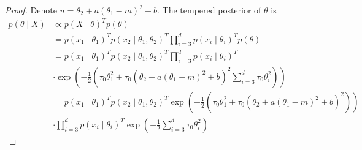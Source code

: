\documentclass[english,twoside,openright]{HYgraduMLDS}
\begin{document}
\begin{appendices}
\begin{proof}
    Denote \(u = \theta_2 + a(\theta_1 - m)^2 + b\).
    The tempered posterior of \(\theta\) is
    \begin{align*}
        p(\theta\mid X) &\propto p(X\mid \theta)^Tp(\theta)
        \\&= p(x_1\mid \theta_1)^Tp(x_2\mid \theta_1, \theta_2)^T
        \prod_{i=3}^d p(x_i\mid \theta_i)^T p(\theta)
        \\&= p(x_1\mid \theta_1)^Tp(x_2\mid \theta_1, \theta_2)^T
        \prod_{i=3}^d p(x_i\mid \theta_i)^T
        \\&\cdot \exp\left(-\frac{1}{2}\left(\tau_0\theta_1^2
        + \tau_0(\theta_2 + a(\theta_1 - m)^2 + b)^2
        \sum_{i=3}^d \tau_0\theta_i^2\right)\right)
        \\&= p(x_1\mid \theta_1)^Tp(x_2\mid \theta_1, \theta_2)^T
        \exp\left(-\frac{1}{2}\left(\tau_0\theta_1^2
        + \tau_0(\theta_2 + a(\theta_1 - m)^2 + b)^2\right)\right)
        \\&\cdot \prod_{i=3}^d p(x_i\mid \theta_i)^T
        \exp\left(-\frac{1}{2}\sum_{i=3}^d \tau_0\theta_i^2\right)
    \end{align*}


\end{proof}
\end{appendices}
\end{document}
